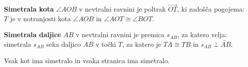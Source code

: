     \begin{definicija}
        \textbf{Simetrala kota} $\angle AOB$ v nevtralni ravnini je poltrak $\overrightarrow{OT}$, ki zadošča pogojema: $T$ je v notranjosti kota $\angle AOB$ in $\angle AOT\cong\angle BOT$.
    \end{definicija}

    \begin{definicija}
        \textbf{Simetrala daljice} $AB$ v nevtralni ravnini je premica $s_{AB}$, za katero velja: simetrala $s_{AB}$ seka daljico $AB$ v točki $T$, za katero je $TA\cong TB$ in $s_{AB}\perp\overleftrightarrow{AB}$.
    \end{definicija}

    \begin{trditev}
        Vsak kot ima simetralo in vsaka stranica ima simetralo.
    \end{trditev}


